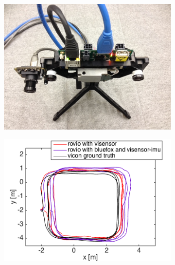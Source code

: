 \chapter{}\label{sec:appendix_mydata}

\begin{figure}[h]
  \begin{subfigure}[b]{0.40\textwidth}
    \includegraphics[width=\textwidth]{images/vi_bluefox.JPG}
    \caption{}
  \end{subfigure}
  \hfill
  \begin{subfigure}[b]{0.42\textwidth}
    \includegraphics[width=\textwidth]{images/slow_2D.png}
    \caption{}
  \end{subfigure}
  \hfill
  \begin{subfigure}[b]{0.42\textwidth}

\end{subfigure}
\end{figure}

